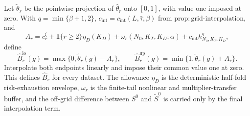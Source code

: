 Let \(\widetilde\theta_r\) be the pointwise projection of \(\widehat\theta_r\) onto \([0,1]\), with value one imposed at zero. With \(q=\min\{\beta+1,2\}\), \(c_{\mathrm{int}}=c_{\mathrm{int}}(L,\bar\tau,\beta)\) from \(\mathrm{prop:grid\mbox{-}interpolation}\), and
\[
 A_r=c_r^\xi+\mathbf 1\{r\ge2\}\eta_D(K_D)
     +\omega_r(N_0,K_T,K_D;\alpha)
     +c_{\mathrm{int}}h_{N_0,K_T,K_D}^{q},
\]
define
\[
 \widehat B_r^{\mathrm{lo}}(g)=\max\{0,\widetilde\theta_r(g)-A_r\},
 \qquad
 \widehat B_r^{\mathrm{up}}(g)=\min\{1,\widetilde\theta_r(g)+A_r\}.
\]
Interpolate both endpoints linearly and impose their common value one at zero. This defines \(\widehat B_r\) for every dataset. The allowance \(\eta_D\) is the deterministic half-fold risk-exhaustion envelope, \(\omega_r\) is the finite-tail nonlinear and multiplier-transfer buffer, and the off-grid difference between \(S^0\) and \(\widetilde S^0\) is carried only by the final interpolation term.